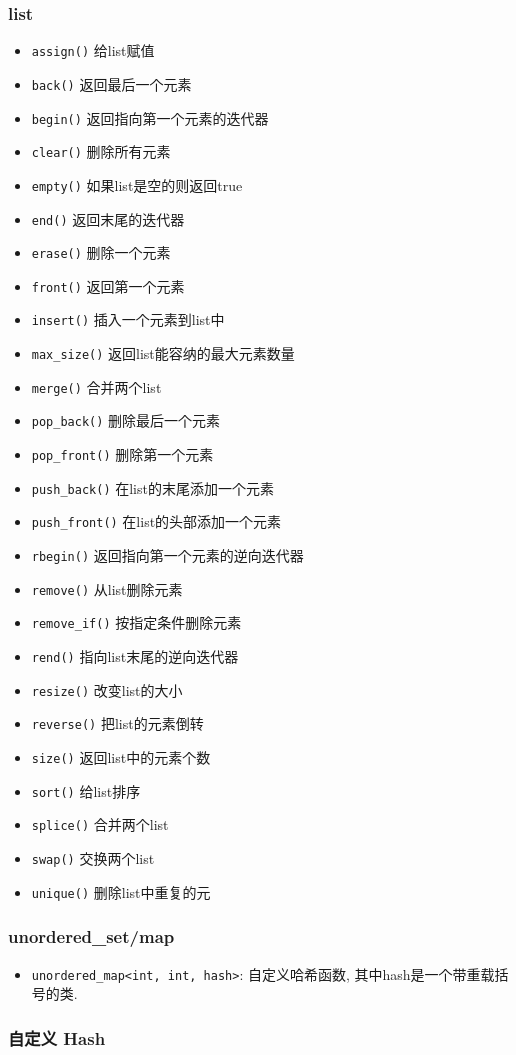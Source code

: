 \subsubsection{list}
	\begin{itemize}
		\item \texttt{assign()} 给list赋值 
		\item \texttt{back()} 返回最后一个元素 
		\item \texttt{begin()} 返回指向第一个元素的迭代器 
		\item \texttt{clear()} 删除所有元素 
		\item \texttt{empty()} 如果list是空的则返回true 
		\item \texttt{end()} 返回末尾的迭代器
		\item \texttt{erase()} 删除一个元素
		\item \texttt{front()} 返回第一个元素
		\item \texttt{insert()} 插入一个元素到list中
		\item \texttt{max_size()} 返回list能容纳的最大元素数量
		\item \texttt{merge()} 合并两个list
		\item \texttt{pop_back()} 删除最后一个元素
		\item \texttt{pop_front()} 删除第一个元素
		\item \texttt{push_back()} 在list的末尾添加一个元素
		\item \texttt{push_front()} 在list的头部添加一个元素
		\item \texttt{rbegin()} 返回指向第一个元素的逆向迭代器
		\item \texttt{remove()} 从list删除元素
		\item \texttt{remove_if()} 按指定条件删除元素
		\item \texttt{rend()} 指向list末尾的逆向迭代器
		\item \texttt{resize()} 改变list的大小
		\item \texttt{reverse()} 把list的元素倒转
		\item \texttt{size()} 返回list中的元素个数
		\item \texttt{sort()} 给list排序
		\item \texttt{splice()} 合并两个list
		\item \texttt{swap()} 交换两个list
		\item \texttt{unique()} 删除list中重复的元
	\end{itemize}

\subsubsection{unordered\_set/map}

\begin{itemize}
	\item \texttt{unordered_map<int, int, hash>}: 自定义哈希函数, 其中hash是一个带重载括号的类.
\end{itemize}

\subsubsection{自定义 Hash}
	\inputminted{cpp}{../src/misc/hash.cpp}